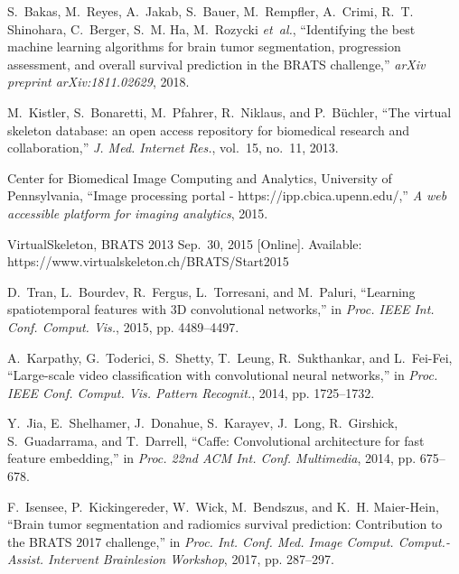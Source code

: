 \documentclass[journal,twoside]{IEEEtran}
\begin{document}
\begin{thebibliography}{55}
S.~Bakas, M.~Reyes, A.~Jakab, S.~Bauer, M.~Rempfler, A.~Crimi, R.~T. Shinohara, C.~Berger, S.~M. Ha, M.~Rozycki \emph{et~al.}, ``Identifying the best machine learning algorithms for brain tumor segmentation, progression assessment, and overall survival prediction in the BRATS challenge,'' \emph{arXiv preprint arXiv:1811.02629}, 2018.

M.~Kistler, S.~Bonaretti, M.~Pfahrer, R.~Niklaus, and P.~B{\"u}chler, ``The virtual skeleton database: an open access repository for biomedical research
and collaboration,'' \emph{J. Med. Internet Res.}, vol.~15, no.~11, 2013.

Center for Biomedical Image Computing and Analytics, University of Pennsylvania, ``Image processing portal - https://ipp.cbica.upenn.edu/,'' \emph{A web accessible platform for imaging analytics}, 2015.

VirtualSkeleton, BRATS 2013 Sep.~30, 2015 [Online]. Available: https://www.virtualskeleton.ch/BRATS/Start2015


D.~Tran, L.~Bourdev, R.~Fergus, L.~Torresani, and M.~Paluri, ``Learning spatiotemporal features with 3D convolutional networks,'' in \emph{Proc. IEEE Int. Conf. Comput. Vis.}, 2015, pp. 4489--4497.

A.~Karpathy, G.~Toderici, S.~Shetty, T.~Leung, R.~Sukthankar, and L.~Fei-Fei, ``Large-scale video classification with convolutional neural networks,'' in \emph{Proc. IEEE Conf. Comput. Vis. Pattern Recognit.}, 2014, pp. 1725--1732.

Y.~Jia, E.~Shelhamer, J.~Donahue, S.~Karayev, J.~Long, R.~Girshick, S.~Guadarrama, and T.~Darrell, ``Caffe: Convolutional architecture for fast feature embedding,'' in \emph{Proc. 22nd ACM Int. Conf. Multimedia}, 2014, pp. 675--678.

F.~Isensee, P.~Kickingereder, W.~Wick, M.~Bendszus, and K.~H. Maier-Hein, ``Brain tumor segmentation and radiomics survival prediction: Contribution to the {BRATS} 2017 challenge,'' in \emph{Proc. Int. Conf. Med. Image Comput. Comput.-Assist. Intervent Brainlesion Workshop}, 2017, pp. 287--297.
\end{thebibliography}
\end{document}
